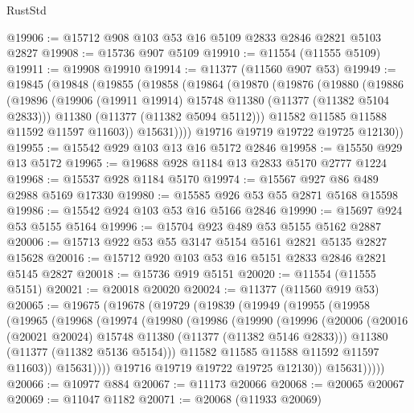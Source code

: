 \begin{lexlean}{RustStd}
\begin{coremodule}
@19906 := @15712 @908 @103 @53 @16 @5109 @2833 @2846 @2821 @5103 @2827
@19908 := @15736 @907 @5109
@19910 := @11554 (@11555 @5109)
@19911 := @19908 @19910
@19914 := @11377 (@11560 @907 @53)
@19949 := @19845
    (@19848
      (@19855
        (@19858
          (@19864
            (@19870
              (@19876
                (@19880
                  (@19886
                    (@19896
                      (@19906 (@19911 @19914) @15748 @11380 (@11377 (@11382 @5104 @2833)))
                      @11380
                      (@11377 (@11382 @5094 @5112)))
                    @11582
                    @11585
                    @11588
                    @11592
                    @11597
                    @11603))
                @15631))))
        @19716
        @19719
        @19722
        @19725
        @12130))
@19955 := @15542 @929 @103 @13 @16 @5172 @2846
@19958 := @15550 @929 @13 @5172
@19965 := @19688 @928 @1184 @13 @2833 @5170 @2777 @1224
@19968 := @15537 @928 @1184 @5170
@19974 := @15567 @927 @86 @489 @2988 @5169 @17330
@19980 := @15585 @926 @53 @55 @2871 @5168 @15598
@19986 := @15542 @924 @103 @53 @16 @5166 @2846
@19990 := @15697 @924 @53 @5155 @5164
@19996 := @15704 @923 @489 @53 @5155 @5162 @2887
@20006 := @15713 @922 @53 @55 @3147 @5154 @5161 @2821 @5135 @2827 @15628
@20016 := @15712 @920 @103 @53 @16 @5151 @2833 @2846 @2821 @5145 @2827
@20018 := @15736 @919 @5151
@20020 := @11554 (@11555 @5151)
@20021 := @20018 @20020
@20024 := @11377 (@11560 @919 @53)
@20065 := @19675
    (@19678
      (@19729
        (@19839
          (@19949
            (@19955
              (@19958
                (@19965
                  (@19968
                    (@19974
                      (@19980
                        (@19986
                          (@19990
                            (@19996
                              (@20006
                                (@20016 (@20021 @20024) @15748 @11380 (@11377 (@11382 @5146 @2833)))
                                @11380
                                (@11377 (@11382 @5136 @5154)))
                              @11582
                              @11585
                              @11588
                              @11592
                              @11597
                              @11603))
                          @15631))))
                  @19716
                  @19719
                  @19722
                  @19725
                  @12130))
              @15631)))))
@20066 := @10977 @884
@20067 := @11173 @20066
@20068 := @20065 @20067
@20069 := @11047 @1182
@20071 := @20068 (@11933 @20069)

\end{coremodule}
\end{lexlean}
